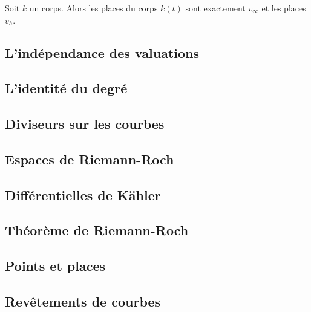 	\begin{pop}
		Soit $k$ un corps.
		Alors les places du corps $k(t)$ sont exactement $v_\infty$ et les places $v_h$.
	\end{pop}

\subsection{L'indépendance des valuations}

	


\subsection{L'identité du degré}

	


\subsection{Diviseurs sur les courbes}

	


\subsection{Espaces de Riemann-Roch}

	


\subsection{Différentielles de Kähler}

	


\subsection{Théorème de Riemann-Roch}

	


\subsection{Points et places}

	


\subsection{Revêtements de courbes}

	

